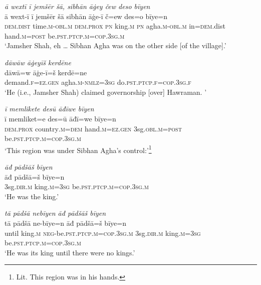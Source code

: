 \ea \label{DP.12}
\textit{ā wextī ī jemšēr šā, sibhān āġey čew deso bīyen} \\ 
\gll ā wext-ī ī jemšēr šā sibhān āġe-ī č=ew des=o bīye=n \\ 
 \textsc{dem.dist} time\textsc{.m}\textsc{-obl}\textsc{.m} \textsc{dem.prox} \textsc{pn} king\textsc{.m} \textsc{pn} agha\textsc{.m}\textsc{-obl}\textsc{.m} in\textsc{=dem}.dist hand\textsc{.m}\textsc{=\textsc{post}} be\textsc{.pst}\textsc{.ptcp}\textsc{.m}\textsc{=cop}\textsc{.3sg}\textsc{.m} \\ 
\glt `Jamsher Shah, eh … Sibhan Agha was on the other side [of the village].'
\z 
 
\ea \label{DP.13}
\textit{dāwāw āġeyīš kerdēne} \\ 
\gll dāwā=w āġe-ī=š kerdē=ne \\ 
 demand\textsc{\textsc{.f}}\textsc{=ez}\textsc{.gen} agha\textsc{.m}\textsc{-nmlz}\textsc{=3sg} do\textsc{.pst}\textsc{.ptcp}\textsc{\textsc{.f}}\textsc{=cop}\textsc{.3sg}\textsc{\textsc{.f}} \\ 
\glt `He (i.e., Jamsher Shah) claimed governorship [over] Hawraman. '
\z 
 
\ea \label{DP.14}
\textit{ī memlikete desū āđīwe bīyen} \\ 
\gll ī memliket=e des=ū āđī=we bīye=n \\ 
 \textsc{dem.prox} country\textsc{.m}\textsc{=dem} hand\textsc{.m}\textsc{=ez}\textsc{.gen} 3sg\textsc{.obl}\textsc{.m}\textsc{=\textsc{post}} be\textsc{.pst}\textsc{.ptcp}\textsc{.m}\textsc{=cop}\textsc{.3sg}\textsc{.m} \\ 
\glt `This region was under Sibhan Agha’s control:'\footnote{Lit. This region was in his hands.}
\z 
 
\ea \label{DP.15}
\textit{āđ pādšāš bīyen} \\ 
\gll āđ pādšā=š bīye=n \\ 
 3sg\textsc{.dir}\textsc{.m} king\textsc{.m}\textsc{=3sg} be\textsc{.pst}\textsc{.ptcp}\textsc{.m}\textsc{=cop}\textsc{.3sg}\textsc{.m} \\ 
\glt `He was the king.'
\z 
 
\ea \label{DP.16}
\textit{tā pādšā nebīyen āđ pādšāš bīyen} \\ 
\gll tā pādšā ne-bīye=n āđ pādšā=š bīye=n \\ 
 until king\textsc{.m} \textsc{neg-}be\textsc{.pst}\textsc{.ptcp}\textsc{.m}\textsc{=cop}\textsc{.3sg}\textsc{.m} 3sg\textsc{.dir}\textsc{.m} king\textsc{.m}\textsc{=3sg} be\textsc{.pst}\textsc{.ptcp}\textsc{.m}\textsc{=cop}\textsc{.3sg}\textsc{.m} \\ 
\glt `He was its king until there were no kings.'
\z 
 
